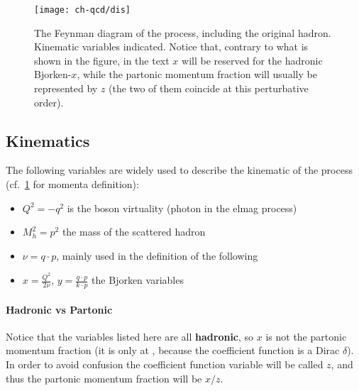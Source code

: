 
\begin{figure}
	\centering
	\texttt{[image: ch-qcd/dis]}
	\caption{
    The \lo Feynman diagram of the \dis process, including the original hadron.
    Kinematic variables indicated. Notice that, contrary to what is shown in
    the figure, in the text $x$ will be reserved for the hadronic Bjorken-$x$,
    while the partonic momentum fraction will usually be represented by $z$
    (the two of them coincide at this perturbative order).
  }
	\label{fig:dis/dis}
\end{figure}

\subsection{Kinematics}

The following variables are widely used to describe the kinematic of the \dis
process (cf.\ \cref{fig:dis/dis} for momenta definition):
\begin{itemize}
  \item $Q^2 = - q^2$ is the \ew boson virtuality (photon in the
    \acrshort{elmag} process)
  \item $M_h^2 = p^2$ the mass of the scattered hadron
  \item $\nu = q \cdot p$, mainly used in the definition of the following
  \item $x = \frac{Q^2}{2\nu}$, $y = \frac{q \cdot p}{k \cdot p}$ the Bjorken
    variables
\end{itemize}

\paragraph{Hadronic vs Partonic} Notice that the variables listed here
are all \textbf{hadronic}, so $x$ is not the partonic momentum fraction (it is only
at \lo , because the coefficient function is a Dirac $\delta$).
In order to avoid confusion the coefficient function variable will be called
$z$, and thus the partonic momentum fraction will be $x/z$.
\newline

